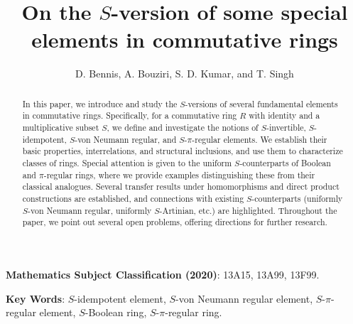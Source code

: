 \documentclass[12pt]{article}
\begin{document}
\title{On the $S$-version of some special elements in commutative rings}
\author{D. Bennis, A. Bouziri, S. D. Kumar, and T. Singh}
\date{}
\maketitle
 \begin{abstract}  In this paper, we introduce and study the $S$-versions of several fundamental elements in commutative rings. Specifically, for a commutative ring $R$  with identity and a multiplicative subset $S$, we define and investigate the notions of $S$-invertible, $S$-idempotent, $S$-von Neumann regular, and $S$-$\pi$-regular elements. We establish their basic properties, interrelations, and structural inclusions, and use them to characterize classes of rings. Special attention is given to the uniform $S$-counterparts of Boolean and $\pi$-regular rings, where we provide examples distinguishing these from their classical analogues. Several transfer results under homomorphisms and direct product constructions are established, and connections with existing $S$-counterparts (uniformly $S$-von Neumann regular, uniformly $S$-Artinian, etc.) are highlighted. Throughout the paper, we point out several open problems, offering directions for further research. \end{abstract}  
 


 {\scriptsize \textbf{Mathematics Subject Classification (2020)}:  13A15, 13A99, 13F99.}

 {\scriptsize \textbf{Key Words}:  $S$-idempotent element, $S$-von Neumann regular element, $S$-$\pi$-regular element, $S$-Boolean ring, $S$-$\pi$-regular ring.}
  
\end{document}
